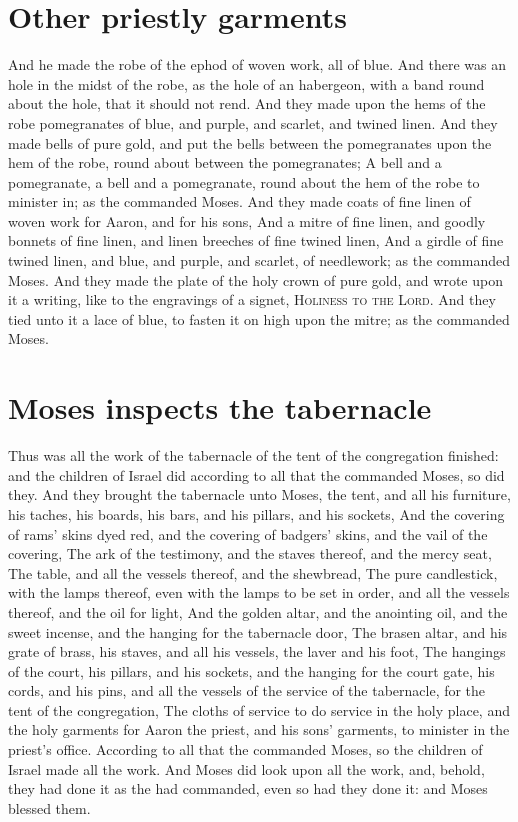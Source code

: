 \begin{biblechapter}
\section*{Other priestly garments}
\verse And he made the robe of the ephod of woven work, all of blue.
\verse And there was an hole in the midst of the robe, as the hole of an habergeon, with a band round about the hole, that it should not rend.
\verse And they made upon the hems of the robe pomegranates of blue, and purple, and scarlet, and twined linen.
\verse And they made bells of pure gold, and put the bells between the pomegranates upon the hem of the robe, round about between the pomegranates;
\verse A bell and a pomegranate, a bell and a pomegranate, round about the hem of the robe to minister in; as the \LORD commanded Moses.
\verse And they made coats of fine linen of woven work for Aaron, and for his sons,
\verse And a mitre of fine linen, and goodly bonnets of fine linen, and linen breeches of fine twined linen,
\verse And a girdle of fine twined linen, and blue, and purple, and scarlet, of needlework; as the \LORD commanded Moses.
\verse And they made the plate of the holy crown of pure gold, and wrote upon it a writing, like to the engravings of a signet, \textsc{Holiness to the Lord}.
\verse And they tied unto it a lace of blue, to fasten it on high upon the mitre; as the \LORD commanded Moses.
\section*{Moses inspects the tabernacle}
\verse Thus was all the work of the tabernacle of the tent of the congregation finished: and the children of Israel did according to all that the \LORD commanded Moses, so did they.
\verse And they brought the tabernacle unto Moses, the tent, and all his furniture, his taches, his boards, his bars, and his pillars, and his sockets,
\verse And the covering of rams' skins dyed red, and the covering of badgers' skins, and the vail of the covering,
\verse The ark of the testimony, and the staves thereof, and the mercy seat,
\verse The table, and all the vessels thereof, and the shewbread,
\verse The pure candlestick, with the lamps thereof, even with the lamps to be set in order, and all the vessels thereof, and the oil for light,
\verse And the golden altar, and the anointing oil, and the sweet incense, and the hanging for the tabernacle door,
\verse The brasen altar, and his grate of brass, his staves, and all his vessels, the laver and his foot,
\verse The hangings of the court, his pillars, and his sockets, and the hanging for the court gate, his cords, and his pins, and all the vessels of the service of the tabernacle, for the tent of the congregation,
\verse The cloths of service to do service in the holy place, and the holy garments for Aaron the priest, and his sons' garments, to minister in the priest's office.
\verse According to all that the \LORD commanded Moses, so the children of Israel made all the work.
\verse And Moses did look upon all the work, and, behold, they had done it as the \LORD had commanded, even so had they done it: and Moses blessed them.
\end{biblechapter}

